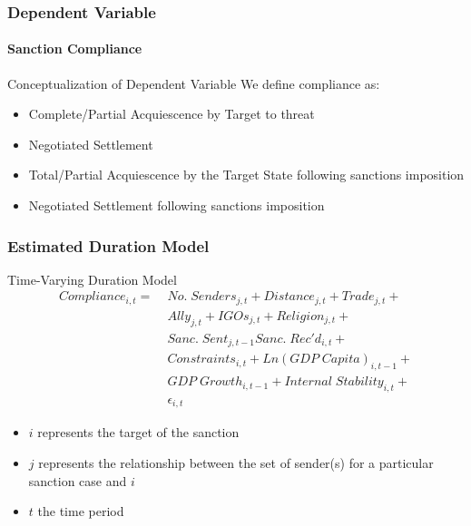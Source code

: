\begin{frame}
\frametitle{Dependent Variable}
\framesubtitle{Sanction Compliance}

\begin{block}{Conceptualization of Dependent Variable}
	We define compliance as:
	\begin{itemize}
		\item Complete/Partial Acquiescence by Target to threat
		\item Negotiated Settlement
		\item Total/Partial Acquiescence by the Target State following sanctions imposition
		\item Negotiated Settlement following sanctions imposition
	\end{itemize}
\end{block}

\end{frame}

\begin{frame}
\frametitle{Estimated Duration Model}

\begin{block}{Time-Varying Duration Model}
	\begin{align*}
		Compliance_{i,t} =\; & No. \; Senders_{j,t} + Distance_{j,t} + Trade_{j,t}  + \\
		 &Ally_{j,t} + IGOs_{j,t} + Religion_{j,t} +\\
 		 &Sanc. \; Sent_{j,t-1} Sanc. \; Rec'd_{i,t} + \\
		 &Constraints_{i,t} + Ln(GDP \; Capita)_{i,t-1} +\\
		 &GDP \; Growth_{i,t-1} + Internal \; Stability_{i,t} +\\
		 &\epsilon_{i,t}
	\end{align*}
\end{block}

\begin{itemize}
	\item $i$ represents the target of the sanction
	\item $j$ represents the relationship between the set of sender(s) for a particular sanction case and $i$
	\item $t$ the time period
\end{itemize}

\end{frame}

